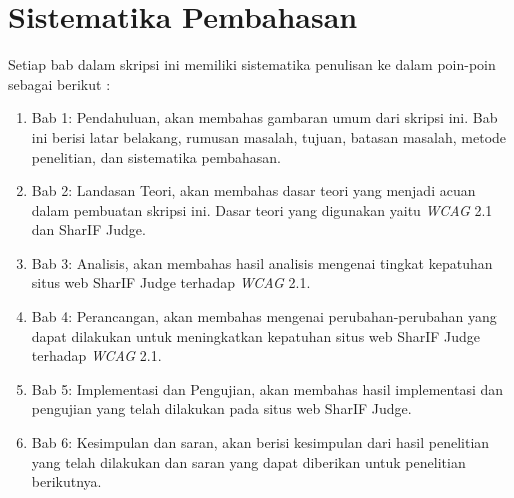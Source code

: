 \section{Sistematika Pembahasan}
\label{sec:sispem}
Setiap bab dalam skripsi ini memiliki sistematika penulisan ke dalam poin-poin sebagai berikut :

\begin{enumerate}
	\item Bab 1: Pendahuluan, akan membahas gambaran umum dari skripsi ini. Bab ini berisi latar
	belakang, rumusan masalah, tujuan, batasan masalah, metode penelitian, dan sistematika
	pembahasan.
	\item Bab 2: Landasan Teori, akan membahas dasar teori yang menjadi acuan dalam pembuatan
	skripsi ini. Dasar teori yang digunakan yaitu \textit{WCAG} 2.1 dan SharIF Judge.
	\item Bab 3: Analisis, akan membahas hasil analisis mengenai tingkat kepatuhan situs web SharIF Judge terhadap \textit{WCAG} 2.1.

	\item Bab 4: Perancangan, akan membahas mengenai perubahan-perubahan yang dapat dilakukan
	untuk meningkatkan kepatuhan situs web SharIF Judge terhadap \textit{WCAG} 2.1.
	\item Bab 5: Implementasi dan Pengujian, akan membahas hasil implementasi dan pengujian yang
	telah dilakukan pada situs web SharIF Judge.
	\item Bab 6: Kesimpulan dan saran, akan berisi kesimpulan dari hasil penelitian yang telah dilakukan
	dan saran yang dapat diberikan untuk penelitian berikutnya.
\end{enumerate}